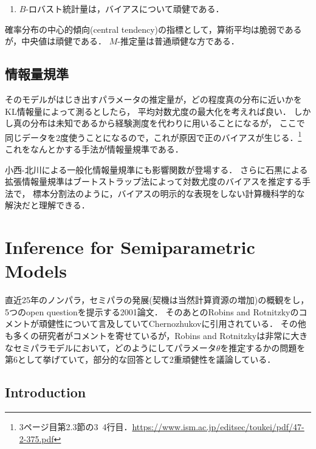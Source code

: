 \documentclass[uplatex,dvipdfmx]{jsreport}
\begin{document}
\begin{enumerate}
    \item $B$-ロバスト統計量は，バイアスについて頑健である．
\end{enumerate}

\begin{example}
    確率分布の中心的傾向(central tendency)の指標として，算術平均は脆弱であるが，中央値は頑健である．
    $M$-推定量は普通頑健な方である．
\end{example}

\subsection{情報量規準}

そのモデルがはじき出すパラメータの推定量が，どの程度真の分布に近いかをKL情報量によって測るとしたら，
平均対数尤度の最大化を考えれば良い．
しかし真の分布は未知であるから経験測度を代わりに用いることになるが，
ここで同じデータを2度使うことになるので，これが原因で正のバイアスが生じる．\footnote{3ページ目第2.3節の3~4行目．\url{https://www.ism.ac.jp/editsec/toukei/pdf/47-2-375.pdf}}
これをなんとかする手法が情報量規準である．

小西-北川による一般化情報量規準にも影響関数が登場する．
さらに石黒による拡張情報量規準はブートストラップ法によって対数尤度のバイアスを推定する手法で，
標本分割法のように，バイアスの明示的な表現をしない計算機科学的な解決だと理解できる．

\section{Inference for Semiparametric Models}

\begin{tcolorbox}[colframe=ForestGreen, colback=ForestGreen!10!white,breakable,colbacktitle=ForestGreen!40!white,coltitle=black,fonttitle=\bfseries\sffamily,
title=]
    直近25年のノンパラ，セミパラの発展(契機は当然計算資源の増加)の概観をし，5つのopen questionを提示する2001論文．
    そのあとのRobins and Rotnitzkyのコメントが頑健性について言及していてChernozhukovに引用されている．
    その他も多くの研究者がコメントを寄せているが，Robins and Rotnitzkyは非常に大きなセミパラモデルにおいて，どのようにしてパラメータ$\theta$を推定するかの問題を第6として挙げていて，部分的な回答として2重頑健性を議論している．

\end{tcolorbox}

\subsection{Introduction}
\end{document}
